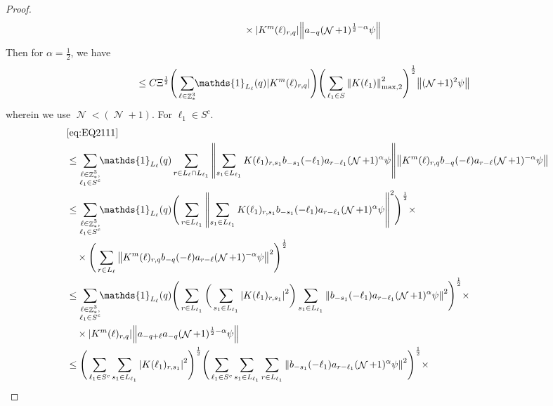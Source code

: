 \documentclass[12pt,a4paper]{article}
\numberwithin{equation}{section}
\newcommand{\1}{\mathbb{I}}
\DeclareMathOperator{\Z}{\mathbb{Z}}
\DeclareMathOperator{\NN}{\mathcal{N}}
\newcommand{\half}{\frac{1}{2}}
\newcommand{\normmaxii}[1]{\norm{#1}_{\mathrm{max,2}}}
\theoremstyle{plain}
\theoremstyle{definition}
\theoremstyle{remark}
\theoremstyle{plain}
\theoremstyle{definition}
\theoremstyle{remark}
\begin{document}
\begin{proof}
\begin{align}
		&\quad \times  \abs{  K^{m}(\ell)_{r,q}} \norm{a_{-q} (\NN+1)^{\half-\alpha}\psi } \nonumber\\
	\end{align}
	Then for $\alpha = \half$, we have 
	\begin{align}
		&\leq C \Xi^{\half} \Bigg(\sum\limits_{\ell \in \Z^3_*} \!\!\mathds{1}_{L_\ell}(q) \abs{  K^{m}(\ell)_{r,q}}\Bigg)  \Bigg( \sum\limits_{ \ell_1 \in S}    \normmaxii{K(\ell_1)}^2\Bigg)^\half  \norm{    (\NN+1)^{2}\psi} 
	\end{align}
	wherein we use $\NN<(\NN+1)$. For $\ell_1 \in S^c$. 
	\begin{align}
		&\eqref{eq:EQ2111}\nonumber\\
		&\leq\sum\limits_{\substack{\ell \in \Z^3_*,\\\ell_1 \in S^c}} \!\!\mathds{1}_{L_\ell}(q) \sum\limits_{ r \in L_\ell \cap L_{\ell_1}}    \norm{ \sum\limits_{s_1 \in L_{\ell_1}} K(\ell_1)_{r,s_1} b_{-s_1}(-\ell_1)  a_{r-\ell_1} (\NN+1)^{\alpha}\psi}\norm{ K^{m}(\ell)_{r,q}   b_{-q}(-\ell) a_{r-\ell} (\NN+1)^{-\alpha}\psi } \nonumber\\
		&\leq \sum\limits_{\substack{\ell \in \Z^3_*,\\\ell_1 \in S^c}} \!\!\mathds{1}_{L_\ell}(q) \Bigg( \sum\limits_{r \in L_{\ell_1}} \norm{\sum\limits_{s_1 \in L_{\ell_1}} K(\ell_1)_{r,s_1} b_{-s_1}(-\ell_1) a_{r-\ell_1} (\NN+1)^{\alpha}\psi}^2\Bigg)^\half \times\nonumber\\
		&\quad \times \Bigg( \sum\limits_{r \in L_\ell}  \norm{  K^{m}(\ell)_{r,q}  b_{-q}(-\ell) a_{r-\ell} (\NN+1)^{-\alpha}\psi }^2\Bigg)^\half \nonumber\\
		&\leq \sum\limits_{\substack{\ell \in \Z^3_*,\\ \ell_1 \in S^c}} \!\!\mathds{1}_{L_\ell}(q) \Bigg( \sum\limits_{r \in L_{\ell_1}} \bigg( \sum\limits_{s_1 \in L_{\ell_1}}\abs{K(\ell_1)_{r,s_1}}^2\bigg) \sum\limits_{s_1 \in L_{\ell_1}} \norm{ b_{-s_1}(-\ell_1)  a_{r-\ell_1} (\NN+1)^{\alpha}\psi}^2\Bigg)^\half \times\nonumber\\
		&\quad \times  \abs{  K^{m}(\ell)_{r,q}} \norm{a_{-q+\ell}a_{-q} (\NN+1)^{\half-\alpha}\psi } \nonumber\\
		&\leq  \Bigg( \sum\limits_{ \ell_1 \in S^c}  \sum\limits_{s_1 \in L_{\ell_1}}\abs{K(\ell_1)_{r,s_1}}^2\Bigg)^\half \Bigg(\sum\limits_{ \ell_1 \in S^c}  \sum\limits_{s_1 \in L_{\ell_1}} \sum\limits_{r \in L_{\ell_1}}\norm{ b_{-s_1}(-\ell_1)  a_{r-\ell_1} (\NN+1)^{\alpha}\psi}^2\Bigg)^\half \times\nonumber\\

\end{align}
\end{proof}
\end{document}
